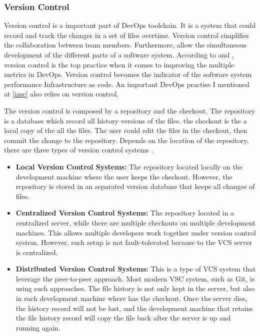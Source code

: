 \subsubsection{Version Control}
Version control is a important part of DevOps toolchain. It is a system that could record and track the changes in a set of files overtime. Version control simplifies the collaboration between team members. Furthermore, allow the simultaneous development of the different parts of a software system. According to \cite{Sourcean53:online} and \cite{velasquez2014state}, version control is the top practice when it comes to improving the multiple metrics in DevOps. Version control becomes the indicator of the software system performance \cite{Sourcean53:online} Infrastructure as code. An important DevOps practise I mentioned at \ref{iasc} also relies on version control.
\par
The version control is composed by a repository and the checkout. The repository is a database which record all history versions of the files. the checkout is the a local copy of the all the files. The user could edit the files in the checkout, then commit the change to the repository. Depends on the location of the repository, there are three types of version control systems \cite{VCS}.
\begin{itemize}
    \item \textbf{Local Version Control Systems:} The repository located locally on the development machine where the user keeps the checkout. However, the repository is stored in an separated version database that keeps all changes of files. 
    \item \textbf{Centralized Version Control Systems:} The repository located in a centralized server, while there are multiple checkouts on multiple development machines. This allows multiple developers work together under version control system. However, such setup is not fault-tolerated because to the VCS server is centralized.
    \item \textbf{Distributed Version Control Systems:} This is a type of VCS system that leverage the peer-to-peer approach. Most modern VSC system, such as Git, is using such approaches. The file history is not only kept in the server, but also in each development machine where has the checkout. Once the server dies, the history record will not be lost, and the development machine that retains the file history record will copy the file back after the server is up and running again.
\end{itemize}
